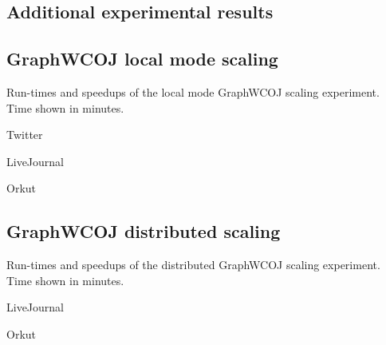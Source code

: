 \begin{appendix}
    \section{Additional experimental results}
    \subsection{Graph\textsc{WCOJ} local mode scaling} \label{app:local-mode-scaling}
    Run-times and speedups of the local mode GraphWCOJ scaling experiment.
    Time shown in minutes.
    \begin{center}
        Twitter
        

        LiveJournal
        

        Orkut
        

    \end{center}

    \subsection{Graph\textsc{WCOJ} distributed scaling} \label{app:distributed-scaling}
    Run-times and speedups of the distributed GraphWCOJ scaling experiment.
    Time shown in minutes.
    \begin{center}
        LiveJournal
        

        Orkut
        

    \end{center}

\end{appendix}
